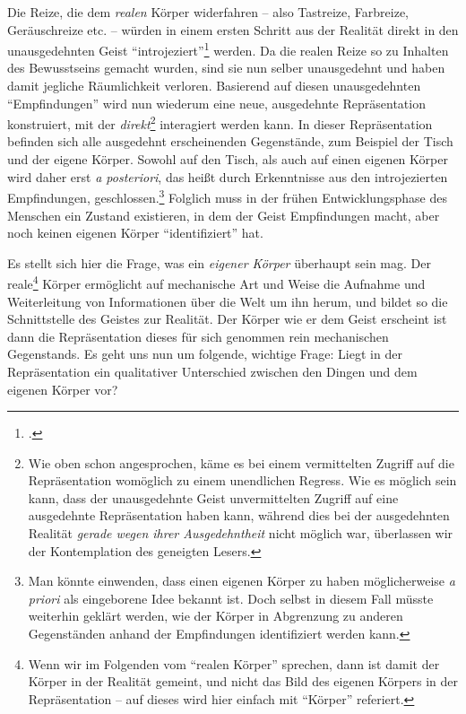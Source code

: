 \documentclass[a4paper, 12pt]{article}
\begin{document}
\begin{onehalfspace}
Die Reize, die dem \emph{realen} Körper widerfahren -- also Tastreize, Farbreize, Geräuschreize etc. -- würden in einem ersten Schritt aus der Realität direkt in den unausgedehnten Geist "`introjeziert"'\footnote{\Cite[Vgl.][S. 497]{scheler-ethik}.} werden. Da die realen Reize so zu Inhalten des Bewusstseins gemacht wurden, sind sie nun selber unausgedehnt und haben damit jegliche Räumlichkeit verloren. Basierend auf diesen unausgedehnten "`Empfindungen"' wird nun wiederum eine neue, ausgedehnte Repräsentation konstruiert, mit der \emph{direkt}\footnote{Wie oben schon angesprochen, käme es bei einem vermittelten Zugriff auf die Repräsentation womöglich zu einem unendlichen Regress. Wie es möglich sein kann, dass der unausgedehnte Geist unvermittelten Zugriff auf eine ausgedehnte Repräsentation haben kann, während dies bei der ausgedehnten Realität \emph{gerade wegen ihrer Ausgedehntheit} nicht möglich war, überlassen wir der Kontemplation des geneigten Lesers.} interagiert werden kann. In dieser Repräsentation befinden sich alle ausgedehnt erscheinenden Gegenstände, zum Beispiel der Tisch und der eigene Körper. Sowohl auf den Tisch, als auch auf einen eigenen Körper wird daher erst \emph{a posteriori}, das heißt durch Erkenntnisse aus den introjezierten Empfindungen, geschlossen.\footnote{Man könnte einwenden, dass einen eigenen Körper zu haben möglicherweise \emph{a priori} als eingeborene Idee bekannt ist. Doch selbst in diesem Fall müsste weiterhin geklärt werden, wie der Körper in Abgrenzung zu anderen Gegenständen anhand der Empfindungen identifiziert werden kann.} Folglich muss in der frühen Entwicklungsphase des Menschen ein Zustand existieren, in dem der Geist Empfindungen macht, aber noch keinen eigenen Körper "`identifiziert"' hat.  

Es stellt sich hier die Frage, was ein \emph{eigener Körper} überhaupt sein mag. Der reale\footnote{Wenn wir im Folgenden vom "`realen Körper"' sprechen, dann ist damit der Körper in der Realität gemeint, und nicht das Bild des eigenen Körpers in der Repräsentation -- auf dieses wird hier einfach mit "`Körper"' referiert.} Körper ermöglicht auf mechanische Art und Weise die Aufnahme und Weiterleitung von Informationen über die Welt um ihn herum, und bildet so die Schnittstelle des Geistes zur Realität. Der Körper wie er dem Geist erscheint ist dann die Repräsentation dieses für sich genommen rein mechanischen Gegenstands. Es geht uns nun um folgende, wichtige Frage: Liegt in der Repräsentation ein qualitativer Unterschied zwischen den Dingen und dem eigenen Körper vor?


\end{onehalfspace}
\end{document}
